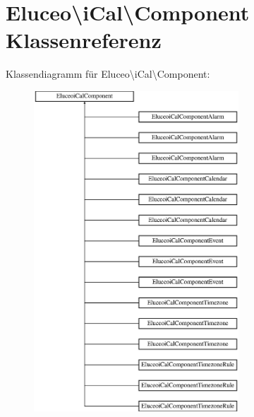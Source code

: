 \hypertarget{class_eluceo_1_1i_cal_1_1_component}{}\section{Eluceo\textbackslash{}i\+Cal\textbackslash{}Component Klassenreferenz}
\label{class_eluceo_1_1i_cal_1_1_component}
Klassendiagramm für Eluceo\textbackslash{}i\+Cal\textbackslash{}Component\+:\begin{figure}[H]
\begin{center}
\leavevmode
\includegraphics[height=12.000000cm]{class_eluceo_1_1i_cal_1_1_component}
\end{center}
\end{figure}

